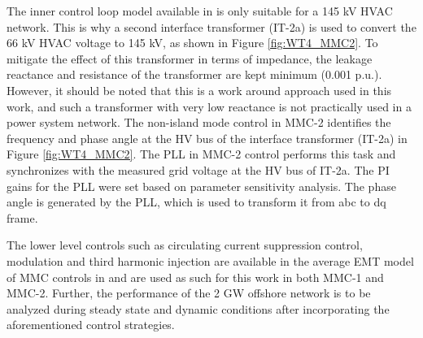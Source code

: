 The inner control loop model available in \cite{vrana2013cigre} is only suitable for a 145 kV \gls{HVAC} network. This is why a second interface transformer (IT-2a) is used to convert the 66 kV \gls{HVAC} voltage to 145 kV, as shown in Figure \ref{fig:WT4_MMC2}. To mitigate the effect of this transformer in terms of impedance, the leakage reactance and resistance of the transformer are kept minimum (0.001 p.u.). However, it should be noted that this is a work around approach used in this work, and such a transformer with very low reactance is not practically used in a power system network. The non-island mode control in \gls{MMC}-2 identifies the frequency and phase angle at the \gls{HV} bus of the interface transformer (IT-2a) in Figure \ref{fig:WT4_MMC2}. The \gls{PLL} in \gls{MMC}-2 control performs this task and synchronizes with the measured grid voltage at the \gls{HV} bus of IT-2a. The \gls{PI} gains for the \gls{PLL} were set based on parameter sensitivity analysis. The phase angle is generated by the \gls{PLL}, which is used to transform it from abc to \gls{dq} frame.

The lower level controls such as circulating current suppression control, modulation and third harmonic injection %
are available in the average \gls{EMT} model of \gls{MMC} controls in \cite{vrana2013cigre} and are used as such for this work in both \gls{MMC}-1 and \gls{MMC}-2. Further, the performance of the 2 GW offshore network is to be analyzed during steady state and dynamic conditions after incorporating the aforementioned control strategies.

